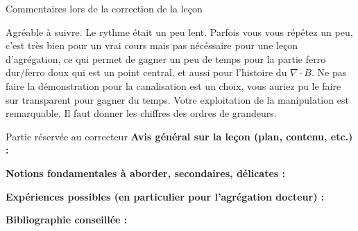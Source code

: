\begin{reportBlock}{Commentaires lors de la correction de la leçon}

Agréable à suivre. Le rythme était un peu lent. Parfois vous vous répétez un peu, c'est très bien pour un vrai cours mais pas nécéssaire pour une leçon d'agrégation, ce qui permet de gagner un peu de temps pour la partie ferro dur/ferro doux qui est un point central, et aussi pour l'histoire du $\nabla \cdot B$. Ne pas faire la démonstration pour la canalisation est un choix, vous auriez pu le faire sur transparent pour gagner du temps. Votre exploitation de la manipulation est remarquable. Il faut donner les chiffres des ordres de grandeurs. 

\end{reportBlock}



\begin{reportBlock}{Partie réservée au correcteur}
  \textbf{Avis général sur la leçon (plan, contenu, etc.) :}
  
  
  \textbf{Notions fondamentales à aborder, secondaires, délicates :}
  
  
  \textbf{Expériences possibles (en particulier pour l'agrégation docteur) :}
  
  
  \textbf{Bibliographie conseillée :}
\end{reportBlock}
